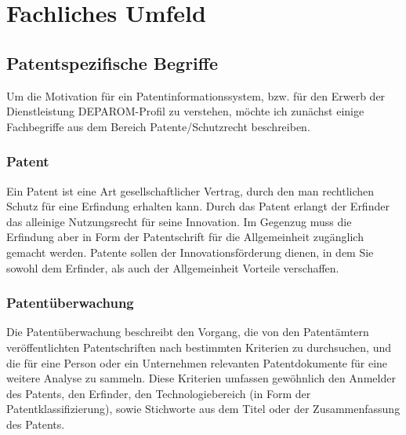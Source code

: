 
\chapter{Fachliches Umfeld} %

\label{ch:fachlichesUmfeld} %

\section{Patentspezifische Begriffe}
\label{ch:fachlichesUmfeld:PatentspezifischeBegriffe}

Um die Motivation für ein Patentinformationssystem, bzw. für den Erwerb der
Dienstleistung DEPAROM-Profil zu verstehen, möchte ich zunächst einige
Fachbegriffe aus dem Bereich Patente/Schutzrecht beschreiben.

\subsection{Patent}
\label{ch:fachlichesUmfeld:PatentspezifischeBegriffe:Patent}

Ein Patent ist eine Art gesellschaftlicher Vertrag, durch den man rechtlichen
Schutz für eine Erfindung erhalten kann. Durch das Patent erlangt der Erfinder
das alleinige Nutzungsrecht für seine Innovation. Im Gegenzug muss die Erfindung
aber in Form der Patentschrift für die Allgemeinheit zugänglich gemacht werden.
Patente sollen der Innovationsförderung dienen, in dem Sie sowohl dem Erfinder,
als auch der Allgemeinheit Vorteile verschaffen.

\subsection{Patentüberwachung}
\label{ch:fachlichesUmfeld:PatentspezifischeBegriffe:Patentueberwachung}

Die Patentüberwachung beschreibt den Vorgang, die von den Patentämtern
veröffentlichten Patentschriften nach bestimmten Kriterien zu durchsuchen, und
die für eine Person oder ein Unternehmen relevanten Patentdokumente für eine
weitere Analyse zu sammeln. Diese Kriterien umfassen gewöhnlich den Anmelder des
Patents, den Erfinder, den Technologiebereich (in Form der
Patentklassifizierung), sowie Stichworte aus dem Titel oder der Zusammenfassung
des Patents.

